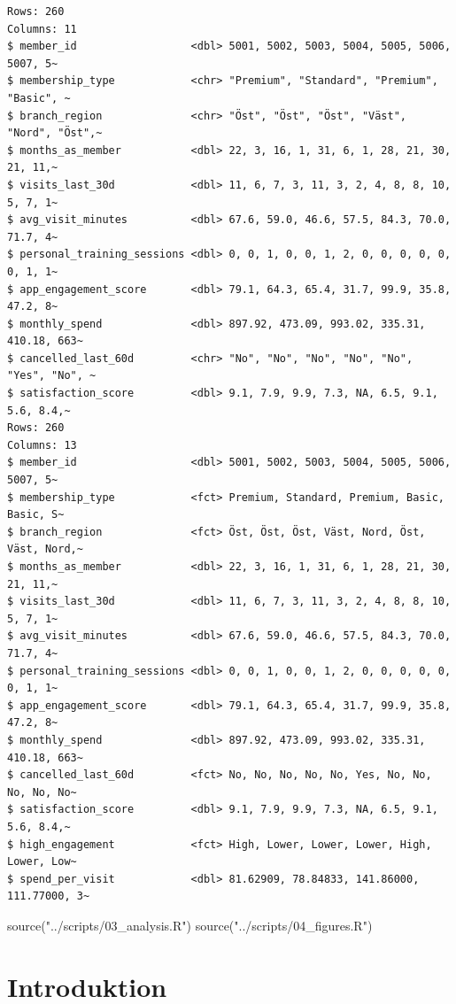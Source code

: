 \documentclass[
  letterpaper,
  DIV=11,
  numbers=noendperiod]{scrartcl}
\newenvironment{Shaded}{\begin{snugshade}}{\end{snugshade}}
\newcommand{\FunctionTok}[1]{\textcolor[rgb]{0.28,0.35,0.67}{#1}}
\newcommand{\NormalTok}[1]{\textcolor[rgb]{0.00,0.23,0.31}{#1}}
\newcommand{\StringTok}[1]{\textcolor[rgb]{0.13,0.47,0.30}{#1}}
\begin{document}
\begin{verbatim}
Rows: 260
Columns: 11
$ member_id                  <dbl> 5001, 5002, 5003, 5004, 5005, 5006, 5007, 5~
$ membership_type            <chr> "Premium", "Standard", "Premium", "Basic", ~
$ branch_region              <chr> "Öst", "Öst", "Öst", "Väst", "Nord", "Öst",~
$ months_as_member           <dbl> 22, 3, 16, 1, 31, 6, 1, 28, 21, 30, 21, 11,~
$ visits_last_30d            <dbl> 11, 6, 7, 3, 11, 3, 2, 4, 8, 8, 10, 5, 7, 1~
$ avg_visit_minutes          <dbl> 67.6, 59.0, 46.6, 57.5, 84.3, 70.0, 71.7, 4~
$ personal_training_sessions <dbl> 0, 0, 1, 0, 0, 1, 2, 0, 0, 0, 0, 0, 0, 1, 1~
$ app_engagement_score       <dbl> 79.1, 64.3, 65.4, 31.7, 99.9, 35.8, 47.2, 8~
$ monthly_spend              <dbl> 897.92, 473.09, 993.02, 335.31, 410.18, 663~
$ cancelled_last_60d         <chr> "No", "No", "No", "No", "No", "Yes", "No", ~
$ satisfaction_score         <dbl> 9.1, 7.9, 9.9, 7.3, NA, 6.5, 9.1, 5.6, 8.4,~
Rows: 260
Columns: 13
$ member_id                  <dbl> 5001, 5002, 5003, 5004, 5005, 5006, 5007, 5~
$ membership_type            <fct> Premium, Standard, Premium, Basic, Basic, S~
$ branch_region              <fct> Öst, Öst, Öst, Väst, Nord, Öst, Väst, Nord,~
$ months_as_member           <dbl> 22, 3, 16, 1, 31, 6, 1, 28, 21, 30, 21, 11,~
$ visits_last_30d            <dbl> 11, 6, 7, 3, 11, 3, 2, 4, 8, 8, 10, 5, 7, 1~
$ avg_visit_minutes          <dbl> 67.6, 59.0, 46.6, 57.5, 84.3, 70.0, 71.7, 4~
$ personal_training_sessions <dbl> 0, 0, 1, 0, 0, 1, 2, 0, 0, 0, 0, 0, 0, 1, 1~
$ app_engagement_score       <dbl> 79.1, 64.3, 65.4, 31.7, 99.9, 35.8, 47.2, 8~
$ monthly_spend              <dbl> 897.92, 473.09, 993.02, 335.31, 410.18, 663~
$ cancelled_last_60d         <fct> No, No, No, No, No, Yes, No, No, No, No, No~
$ satisfaction_score         <dbl> 9.1, 7.9, 9.9, 7.3, NA, 6.5, 9.1, 5.6, 8.4,~
$ high_engagement            <fct> High, Lower, Lower, Lower, High, Lower, Low~
$ spend_per_visit            <dbl> 81.62909, 78.84833, 141.86000, 111.77000, 3~
\end{verbatim}

\begin{Shaded}
\begin{Highlighting}[]
\FunctionTok{source}\NormalTok{(}\StringTok{"../scripts/03\_analysis.R"}\NormalTok{)}
\FunctionTok{source}\NormalTok{(}\StringTok{"../scripts/04\_figures.R"}\NormalTok{)}
\end{Highlighting}
\end{Shaded}

\section{Introduktion}\label{introduktion}
\end{document}
